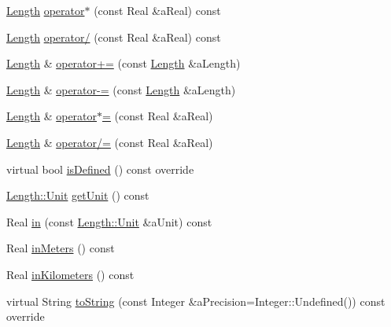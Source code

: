 \begin{DoxyCompactItemize}
\item 
\hyperlink{classlibrary_1_1physics_1_1units_1_1_length}{Length} \hyperlink{classlibrary_1_1physics_1_1units_1_1_length_ab14bc23b1849cb38d2f9ede2bda27ca5}{operator$\ast$} (const Real \&a\+Real) const
\item 
\hyperlink{classlibrary_1_1physics_1_1units_1_1_length}{Length} \hyperlink{classlibrary_1_1physics_1_1units_1_1_length_a00c891576d9dac185b81cca7d705653e}{operator/} (const Real \&a\+Real) const
\item 
\hyperlink{classlibrary_1_1physics_1_1units_1_1_length}{Length} \& \hyperlink{classlibrary_1_1physics_1_1units_1_1_length_ac3a51c8bd2a7c6f9ef39a3444d0bc3dc}{operator+=} (const \hyperlink{classlibrary_1_1physics_1_1units_1_1_length}{Length} \&a\+Length)
\item 
\hyperlink{classlibrary_1_1physics_1_1units_1_1_length}{Length} \& \hyperlink{classlibrary_1_1physics_1_1units_1_1_length_a5b02e27f94eea5c5b2b4c7a8e36ab243}{operator-\/=} (const \hyperlink{classlibrary_1_1physics_1_1units_1_1_length}{Length} \&a\+Length)
\item 
\hyperlink{classlibrary_1_1physics_1_1units_1_1_length}{Length} \& \hyperlink{classlibrary_1_1physics_1_1units_1_1_length_a60c23be1726de0970339298e4053e75d}{operator$\ast$=} (const Real \&a\+Real)
\item 
\hyperlink{classlibrary_1_1physics_1_1units_1_1_length}{Length} \& \hyperlink{classlibrary_1_1physics_1_1units_1_1_length_a42aee215b77a88b3c032b1fc6b8d7117}{operator/=} (const Real \&a\+Real)
\item 
virtual bool \hyperlink{classlibrary_1_1physics_1_1units_1_1_length_a0249a542e7cc613e6a39275b4e37bd05}{is\+Defined} () const override
\item 
\hyperlink{classlibrary_1_1physics_1_1units_1_1_length_a3b8b39cd245cf6b19dc34459baeccb18}{Length\+::\+Unit} \hyperlink{classlibrary_1_1physics_1_1units_1_1_length_ab0a44822f33903e24c3dc8021d185348}{get\+Unit} () const
\item 
Real \hyperlink{classlibrary_1_1physics_1_1units_1_1_length_a8cabc872d3de8fe8c9abf9d09462a7e8}{in} (const \hyperlink{classlibrary_1_1physics_1_1units_1_1_length_a3b8b39cd245cf6b19dc34459baeccb18}{Length\+::\+Unit} \&a\+Unit) const
\item 
Real \hyperlink{classlibrary_1_1physics_1_1units_1_1_length_ae8064733601131d3ccf1e5d53ecaf001}{in\+Meters} () const
\item 
Real \hyperlink{classlibrary_1_1physics_1_1units_1_1_length_a0d57a97fc408ae0f1a5353d0ee5837aa}{in\+Kilometers} () const
\item 
virtual String \hyperlink{classlibrary_1_1physics_1_1units_1_1_length_aea1d96e6930f7e6e6383e78c55219a64}{to\+String} (const Integer \&a\+Precision=Integer\+::\+Undefined()) const override
\end{DoxyCompactItemize}
